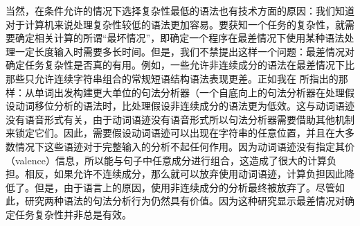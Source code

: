 当然，在条件允许的情况下选择复杂性最低的语法也有技术方面的原因：我们知道对于计算机来说处理复杂性较低的语法更加容易。要获知一个任务的复杂性，就需要确定相关计算的所谓“最坏情况”，即确定一个程序在最差情况下使用某种语法处理一定长度输入时需要多长时间。但是，我们不禁提出这样一个问题：最差情况对确定任务复杂性是否真的有用。例如，一些允许非连续成分的语法在最差情况下比那些只允许连续字符串组合的常规短语结构语法表现更差\citep[\S~8]{Reape91}。正如我在 所指出的那样：从单词出发构建更大单位的句法分析器（一个自底向上的句法分析器在处理假设动词移位分析的语法时，比处理假设非连续成分的语法更为低效。这与动词语迹没有语音形式有关，由于动词语迹没有语音形式所以句法分析器需要借助其他机制来锁定它们。因此，需要假设动词语迹可以出现在字符串的任意位置，并且在大多数情况下这些语迹对于完整输入的分析不起任何作用。因为动词语迹没有指定其价（valence）信息，所以能与句子中任意成分进行组合，这造成了很大的计算负担。相反，如果允许不连续成分，那么就可以放弃使用动词语迹，计算负担因此降低了。但是，由于语言上的原因，使用非连续成分的分析最终被放弃了\citep{Mueller2005c,Mueller2005d,MuellerLehrbuch1,MuellerGS}。尽管如此，研究两种语法的句法分析行为仍然具有价值。因为这种研究显示最差情况对确定任务复杂性并非总是有效。
